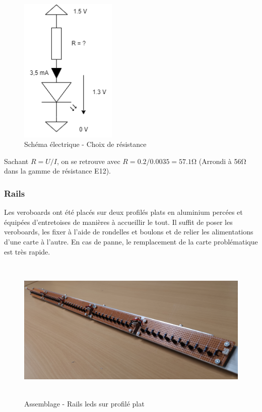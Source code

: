 \begin{figure}[H]
    \centering
    \includegraphics[height=7cm]{assets/figures/schema_led_res.png}
    \caption{Schéma électrique - Choix de résistance}
\end{figure}

Sachant \(R = U / I\), on se retrouve avec \(R = 0.2 / 0.0035 = 57.1 \si{\ohm} \) (Arrondi à 56\si{\ohm} dans la gamme de résistance E12).

\subsubsection{Rails}
Les veroboards ont été placés sur deux profilés plats en aluminium percées et équipées d'entretoises de manières à accueillir le tout. Il suffit de poser les veroboards,
les fixer à l'aide de rondelles et boulons et de relier les alimentations d'une carte à l'autre. En cas de panne, le remplacement de la carte problématique est très rapide.

\begin{figure}[H]
    \centering
    \includegraphics[height=7cm]{assets/figures/rail_alu_led.jpg}
    \caption{Assemblage - Rails leds sur profilé plat}
\end{figure}

